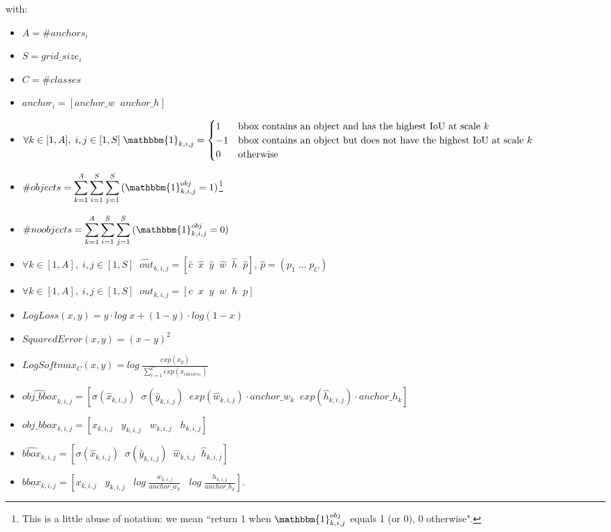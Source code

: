 \documentclass[../report.tex]{subfiles}
\begin{document}
with:
\begin{itemize}
    \item $A=\#anchors_i$
    \item $S=grid\_size_i$
    \item $C=\#classes$
    \item $anchor_i = [anchor\_w \; \; anchor\_h]$
    \item $\forall{} k \in [1,A], \; i, j \in [1,S] \; \mathbbm{1}_{k,i,j} = \begin{cases}
        1 & \text{bbox contains an object and has the highest IoU at scale $k$}\\
        -1 & \text{bbox contains an object but does not have the highest IoU at scale $k$}\\
        0 & \text{otherwise}\\
    \end{cases}$
    \item $\#objects = \displaystyle\sum_{k=1}^{A}{\displaystyle\sum_{i=1}^{S}{\displaystyle\sum_{j=1}^{S}{(\mathbbm{1}_{k,i,j}^{obj} = 1)}}}$\footnote{\label{ft:note}This is a little abuse of notation: we mean ``return 1 when $\mathbbm{1}_{k,i,j}^{obj}$ equals 1 (or 0), 0 otherwise".}
    \item $\#noobjects = \displaystyle\sum_{k=1}^{A}{\displaystyle\sum_{i=1}^{S}{\displaystyle\sum_{j=1}^{S}{(\mathbbm{1}_{k,i,j}^{obj}}} = 0)}$
    \item $\forall{} k \in [1,A], \; i, j \in [1,S] \; \; \hat{out}_{k,i,j} = [\hat{c} \; \; \hat{x} \; \; \hat{y} \; \; \hat{w} \; \; \hat{h} \; \; \hat{p}]$, $\hat{p} = (p_1 \; \dots \; p_C)$
    \item $\forall{} k \in [1,A], \; i, j \in [1,S] \; \; out_{k,i,j} = [c \; \; x \; \; y \; \; w \; \; h \; \; p]$
    \item $LogLoss(x, y) = y \cdot{} log\;x + (1-y) \cdot{} log(1-x)$
    \item $SquaredError(x, y) = (x - y)^2$
    \item $LogSoftmax_C(x, y) = log \; \frac{exp(x_y)}{\sum_{c = 1}^{C}{exp(x_{classes_c})}}$
    \item $\hat{obj\_bbox}_{k,i,j} = [\sigma(\hat{x}_{k,i,j}) \; \; \sigma(\hat{y}_{k,i,j}) \; \; exp(\hat{w}_{k,i,j})\cdot{}anchor\_w_k \; \; exp(\hat{h}_{k,i,j})\cdot{}anchor\_h_k]$
    \item $obj\_bbox_{k,i,j} = [x_{k,i,j} \; \; \; y_{k,i,j} \; \; \; w_{k,i,j} \; \; \; h_{k,i,j}]$
    \item $\hat{bbox}_{k,i,j} = [\sigma(\hat{x}_{k,i,j}) \; \; \sigma(\hat{y}_{k,i,j}) \; \; \hat{w}_{k,i,j} \; \; \hat{h}_{k,i,j}]$
    \item $bbox_{k,i,j} = [x_{k,i,j} \; \; \; y_{k,i,j} \; \; \; log \; \frac{w_{k,i,j}}{anchor\_w_k} \; \; \; log \; \frac{h_{k,i,j}}{anchor\_h_k}]$.
\end{itemize}
\end{document}
